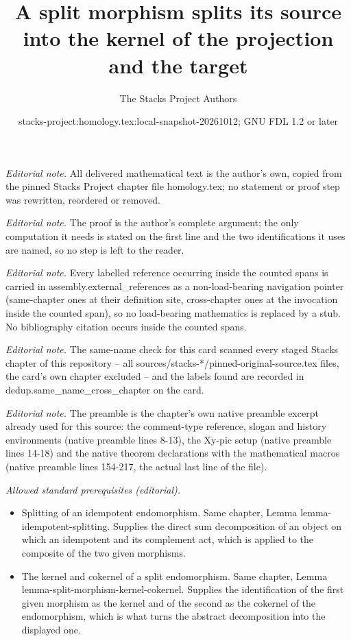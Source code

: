 \documentclass[10pt,a4paper]{amsart}
\title{A split morphism splits its source into the kernel of the projection and the target}
\author{The Stacks Project Authors}
\date{stacks-project:homology.tex:local-snapshot-20261012; GNU FDL 1.2 or later}
\theoremstyle{plain}
\theoremstyle{definition}
\theoremstyle{remark}
\numberwithin{equation}{subsection}
\begin{document}
\maketitle
\noindent\textit{Editorial note.} All delivered mathematical text is the author's own, copied from the pinned Stacks Project chapter file homology.tex; no statement or proof step was rewritten, reordered or removed.\par\medskip
\noindent\textit{Editorial note.} The proof is the author's complete argument; the only computation it needs is stated on the first line and the two identifications it uses are named, so no step is left to the reader.\par\medskip
\noindent\textit{Editorial note.} Every labelled reference occurring inside the counted spans is carried in assembly.external\_references as a non-load-bearing navigation pointer (same-chapter ones at their definition site, cross-chapter ones at the invocation inside the counted span), so no load-bearing mathematics is replaced by a stub. No bibliography citation occurs inside the counted spans.\par\medskip
\noindent\textit{Editorial note.} The same-name check for this card scanned every staged Stacks chapter of this repository -- all sources/stacks-*/pinned-original-source.tex files, the card's own chapter excluded -- and the labels found are recorded in dedup.same\_name\_cross\_chapter on the card.\par\medskip
\noindent\textit{Editorial note.} The preamble is the chapter's own native preamble excerpt already used for this source: the comment-type reference, slogan and history environments (native preamble lines 8-13), the Xy-pic setup (native preamble lines 14-18) and the native theorem declarations with the mathematical macros (native preamble lines 154-217, the actual last line of the file).\par\medskip
\noindent\textit{Allowed standard prerequisites (editorial).}\begin{itemize}
\item Splitting of an idempotent endomorphism. Same chapter, Lemma lemma-idempotent-splitting. Supplies the direct sum decomposition of an object on which an idempotent and its complement act, which is applied to the composite of the two given morphisms.
\item The kernel and cokernel of a split endomorphism. Same chapter, Lemma lemma-split-morphism-kernel-cokernel. Supplies the identification of the first given morphism as the kernel and of the second as the cokernel of the endomorphism, which is what turns the abstract decomposition into the displayed one.
\end{itemize}\medskip
\end{document}
